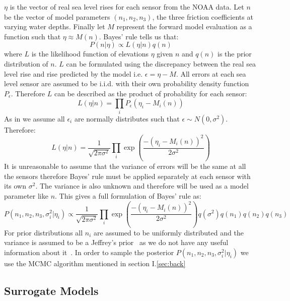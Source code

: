 \documentclass[12pt,a4paper]{article}
\begin{document}
$\eta$ is the vector of real sea level rises for each sensor from the NOAA data. Let $n$ be the vector of model parameters $(n_1,n_2,n_3)$, the three friction coefficients at varying water depths. Finally let $M$ represent the forward model evaluation as a function such that $\eta \approx M(n)$. Bayes' rule tells us that:
\begin{equation}
	P(n|\eta) \propto L(\eta|n)q(n)
\end{equation}
where $L$ is the likelihood function of elevations $\eta$ given $n$ and $q(n)$ is the prior distribution of $n$. $L$ can be formulated using the discrepancy between the real sea level rise and rise predicted by the model i.e. $\epsilon=\eta-M$. All errors at each sea level sensor are assumed to be i.i.d. with their own probability density function $P_\epsilon$. Therefore $L$ can be described as the product of probability for each sensor:
\begin{equation}
	L(\eta|n)=\prod_i P_\epsilon(\eta_i - M_i(n))
\end{equation}
As in  we assume all $\epsilon_i$ are normally distributes such that $\epsilon\sim N(0,\sigma^2)$. Therefore:
\begin{equation}
	L(\eta|n) = \frac{1}{\sqrt{2\pi\sigma^2}}\prod_i \exp \left(   \frac{-(\eta_i-M_i(n))^2}{2\sigma^2}  \right)
\end{equation}
It is unreasonable to assume that the variance of errors will be the same at all the sensors therefore Bayes' rule must be applied separately at each sensor with its own $\sigma^2$. The variance is also unknown and therefore will be used as a model parameter like $n$. This gives a full formulation of Bayes' rule as:
\begin{equation}
	P(n_1,n_2,n_3,\sigma^2_i|\eta_i)\propto \frac{1}{\sqrt{2\pi\sigma^2}}\prod_i\exp\left(
	\frac{-(\eta_i - M_i(n))^2}{2\sigma^2}
	\right)q(\sigma^2)q(n_1)q(n_2)q(n_3)
\end{equation}
For prior distributions all $n_i$ are assumed to be uniformly distributed and the variance is assumed to be a Jeffrey's prior~\cite{bayesbook} as we do not have any useful information about it~\cite{tsunami}. In order to sample the posterior $P(n_1,n_2,n_3,\sigma^2_i|\eta_i)$ we use the MCMC algorithm mentioned in section I.\ref{sec:back}
\subsection{Surrogate Models}
\end{document}
